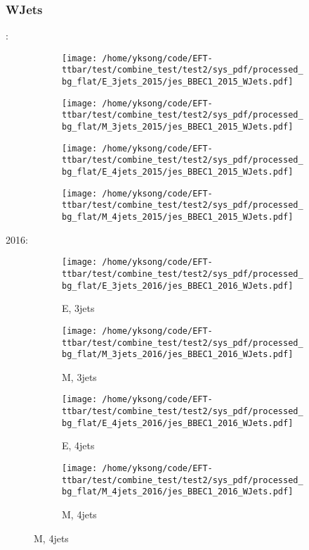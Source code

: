 \documentclass{beamer}
\begin{document}
\begin{frame}
\frametitle{WJets}
\fontsize{5}{1}:
\begin{figure}
\centering
\begin{subfigure}[b]{0.24\textwidth}
\texttt{[image: /home/yksong/code/EFT-ttbar/test/combine\_test/test2/sys\_pdf/processed\_bg\_flat/E\_3jets\_2015/jes\_BBEC1\_2015\_WJets.pdf]}
\end{subfigure}
\begin{subfigure}[b]{0.24\textwidth}
\texttt{[image: /home/yksong/code/EFT-ttbar/test/combine\_test/test2/sys\_pdf/processed\_bg\_flat/M\_3jets\_2015/jes\_BBEC1\_2015\_WJets.pdf]}
\end{subfigure}
\begin{subfigure}[b]{0.24\textwidth}
\texttt{[image: /home/yksong/code/EFT-ttbar/test/combine\_test/test2/sys\_pdf/processed\_bg\_flat/E\_4jets\_2015/jes\_BBEC1\_2015\_WJets.pdf]}
\end{subfigure}
\begin{subfigure}[b]{0.24\textwidth}
\texttt{[image: /home/yksong/code/EFT-ttbar/test/combine\_test/test2/sys\_pdf/processed\_bg\_flat/M\_4jets\_2015/jes\_BBEC1\_2015\_WJets.pdf]}
\end{subfigure}
\end{figure}
2016:
\begin{figure}
\centering
\begin{subfigure}[b]{0.24\textwidth}
\texttt{[image: /home/yksong/code/EFT-ttbar/test/combine\_test/test2/sys\_pdf/processed\_bg\_flat/E\_3jets\_2016/jes\_BBEC1\_2016\_WJets.pdf]}
\captionsetup{font=tiny}
\caption{E, 3jets}
\end{subfigure}
\begin{subfigure}[b]{0.24\textwidth}
\texttt{[image: /home/yksong/code/EFT-ttbar/test/combine\_test/test2/sys\_pdf/processed\_bg\_flat/M\_3jets\_2016/jes\_BBEC1\_2016\_WJets.pdf]}
\captionsetup{font=tiny}
\caption{M, 3jets}
\end{subfigure}
\begin{subfigure}[b]{0.24\textwidth}
\texttt{[image: /home/yksong/code/EFT-ttbar/test/combine\_test/test2/sys\_pdf/processed\_bg\_flat/E\_4jets\_2016/jes\_BBEC1\_2016\_WJets.pdf]}
\captionsetup{font=tiny}
\caption{E, 4jets}
\end{subfigure}
\begin{subfigure}[b]{0.24\textwidth}
\texttt{[image: /home/yksong/code/EFT-ttbar/test/combine\_test/test2/sys\_pdf/processed\_bg\_flat/M\_4jets\_2016/jes\_BBEC1\_2016\_WJets.pdf]}
\captionsetup{font=tiny}
\caption{M, 4jets}
\end{subfigure}
\end{figure}
\end{frame}
\end{document}
